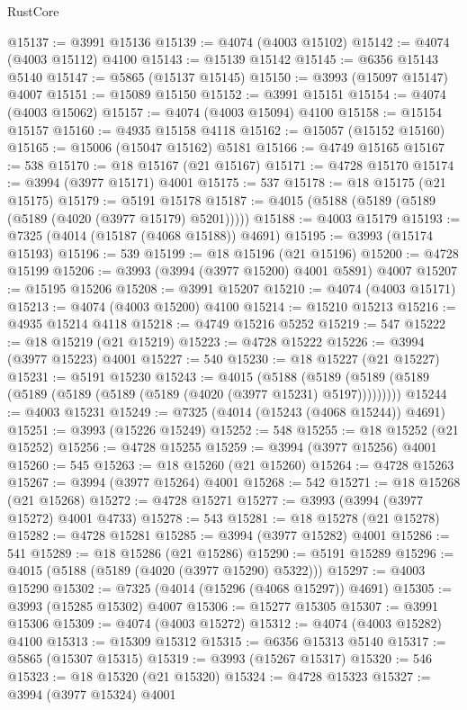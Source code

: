 \begin{lexlean}{RustCore}
\begin{coremodule}
@15137 := @3991 @15136
@15139 := @4074 (@4003 @15102)
@15142 := @4074 (@4003 @15112) @4100
@15143 := @15139 @15142
@15145 := @6356 @15143 @5140
@15147 := @5865 (@15137 @15145)
@15150 := @3993 (@15097 @15147) @4007
@15151 := @15089 @15150
@15152 := @3991 @15151
@15154 := @4074 (@4003 @15062)
@15157 := @4074 (@4003 @15094) @4100
@15158 := @15154 @15157
@15160 := @4935 @15158 @4118
@15162 := @15057 (@15152 @15160)
@15165 := @15006 (@15047 @15162) @5181
@15166 := @4749 @15165
@15167 := 538
@15170 := @18 @15167 (@21 @15167)
@15171 := @4728 @15170
@15174 := @3994 (@3977 @15171) @4001
@15175 := 537
@15178 := @18 @15175 (@21 @15175)
@15179 := @5191 @15178
@15187 := @4015 (@5188 (@5189 (@5189 (@5189 (@4020 (@3977 @15179) @5201)))))
@15188 := @4003 @15179
@15193 := @7325 (@4014 (@15187 (@4068 @15188)) @4691)
@15195 := @3993 (@15174 @15193)
@15196 := 539
@15199 := @18 @15196 (@21 @15196)
@15200 := @4728 @15199
@15206 := @3993 (@3994 (@3977 @15200) @4001 @5891) @4007
@15207 := @15195 @15206
@15208 := @3991 @15207
@15210 := @4074 (@4003 @15171)
@15213 := @4074 (@4003 @15200) @4100
@15214 := @15210 @15213
@15216 := @4935 @15214 @4118
@15218 := @4749 @15216 @5252
@15219 := 547
@15222 := @18 @15219 (@21 @15219)
@15223 := @4728 @15222
@15226 := @3994 (@3977 @15223) @4001
@15227 := 540
@15230 := @18 @15227 (@21 @15227)
@15231 := @5191 @15230
@15243 := @4015
    (@5188 (@5189 (@5189 (@5189 (@5189 (@5189 (@5189 (@5189 (@4020 (@3977 @15231) @5197)))))))))
@15244 := @4003 @15231
@15249 := @7325 (@4014 (@15243 (@4068 @15244)) @4691)
@15251 := @3993 (@15226 @15249)
@15252 := 548
@15255 := @18 @15252 (@21 @15252)
@15256 := @4728 @15255
@15259 := @3994 (@3977 @15256) @4001
@15260 := 545
@15263 := @18 @15260 (@21 @15260)
@15264 := @4728 @15263
@15267 := @3994 (@3977 @15264) @4001
@15268 := 542
@15271 := @18 @15268 (@21 @15268)
@15272 := @4728 @15271
@15277 := @3993 (@3994 (@3977 @15272) @4001 @4733)
@15278 := 543
@15281 := @18 @15278 (@21 @15278)
@15282 := @4728 @15281
@15285 := @3994 (@3977 @15282) @4001
@15286 := 541
@15289 := @18 @15286 (@21 @15286)
@15290 := @5191 @15289
@15296 := @4015 (@5188 (@5189 (@4020 (@3977 @15290) @5322)))
@15297 := @4003 @15290
@15302 := @7325 (@4014 (@15296 (@4068 @15297)) @4691)
@15305 := @3993 (@15285 @15302) @4007
@15306 := @15277 @15305
@15307 := @3991 @15306
@15309 := @4074 (@4003 @15272)
@15312 := @4074 (@4003 @15282) @4100
@15313 := @15309 @15312
@15315 := @6356 @15313 @5140
@15317 := @5865 (@15307 @15315)
@15319 := @3993 (@15267 @15317)
@15320 := 546
@15323 := @18 @15320 (@21 @15320)
@15324 := @4728 @15323
@15327 := @3994 (@3977 @15324) @4001

\end{coremodule}
\end{lexlean}
